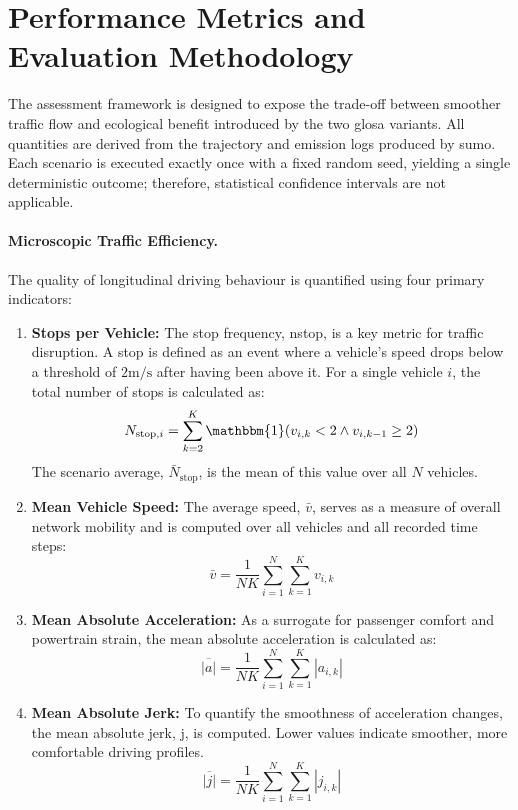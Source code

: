 \section{Performance Metrics and Evaluation Methodology}
\label{sec:performance_evaluation}

The assessment framework is designed to expose the trade-off between smoother traffic flow and ecological benefit introduced by the two \ac{glosa} variants. All quantities are derived from the trajectory and emission logs produced by \ac{sumo}. Each scenario is executed exactly once with a fixed random seed, yielding a single deterministic outcome; therefore, statistical confidence intervals are not applicable.

\paragraph{Microscopic Traffic Efficiency.}
The quality of longitudinal driving behaviour is quantified using four primary indicators:

\begin{enumerate}
    \item \textbf{Stops per Vehicle:} The stop frequency, \gls{nstop}, is a key metric for traffic disruption. A stop is defined as an event where a vehicle's speed drops below a threshold of $2\unit{\metre\per\second}$ after having been above it. For a single vehicle $i$, the total number of stops is calculated as:
    \begin{equation}
        N_{\mathrm{stop},i} = \sum_{k=2}^{K}{\mathbbm{1}}(v_{i,k} < 2 \land v_{i,k-1} \ge 2)
    \end{equation}
    The scenario average, $\bar{N}_{\mathrm{stop}}$, is the mean of this value over all $N$ vehicles.

    \item \textbf{Mean Vehicle Speed:} The average speed, $\bar{v}$, serves as a measure of overall network mobility and is computed over all vehicles and all recorded time steps:
    \begin{equation}
        \bar{v} = \frac{1}{NK}\sum_{i=1}^{N}\sum_{k=1}^{K} v_{i,k}
    \end{equation}

    \item \textbf{Mean Absolute Acceleration:} As a surrogate for passenger comfort and powertrain strain, the mean absolute acceleration is calculated as:
    \begin{equation}
        \overline{|a|} = \frac{1}{NK}\sum_{i=1}^{N}\sum_{k=1}^{K} |a_{i,k}|
    \end{equation}

    \item \textbf{Mean Absolute Jerk:} To quantify the smoothness of acceleration changes, the mean absolute jerk, \gls{j}, is computed. Lower values indicate smoother, more comfortable driving profiles.
    \begin{equation}
        \overline{|j|} = \frac{1}{NK}\sum_{i=1}^{N}\sum_{k=1}^{K} |j_{i,k}|
    \end{equation}
\end{enumerate}

